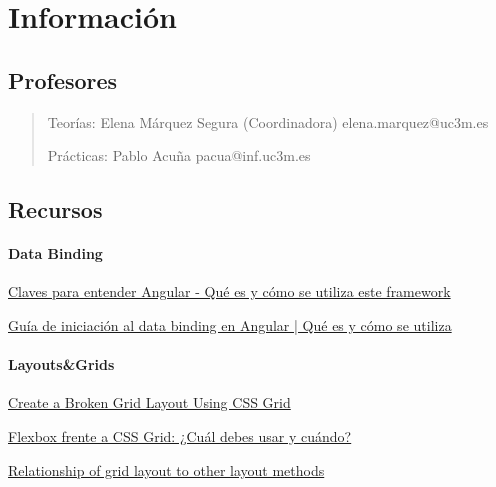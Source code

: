 \documentclass[12pt, twoside, openright]{report} %
\begin{document}
\listoffigures
\thispagestyle{fancy}





\chapter{Información}
\section{Profesores}
\begin{quote}
	Teorías: Elena Márquez Segura (Coordinadora) elena.marquez@uc3m.es

	Prácticas: Pablo Acuña pacua@inf.uc3m.es
\end{quote}

\section{Recursos}

\subsubsection{Data Binding}
\href{https://www.acontracorrientech.com/claves-para-entender-angular-que-es-y-como-se-utiliza/}{Claves para entender Angular - Qué es y cómo se utiliza este framework}

\href{https://www.acontracorrientech.com/guia-practica-del-databinding-en-angular/}{Guía de iniciación al data binding en Angular | Qué es y cómo se utiliza}

\subsubsection{Layouts\&Grids}
\href{https://webdesign.tutsplus.com/tutorials/create-a-broken-grid-layout-using-css-grid--cms-30870}{Create a Broken Grid Layout Using CSS Grid}

\href{https://webdesign.tutsplus.com/es/articles/flexbox-vs-css-grid-which-should-you-use--cms-30184}{Flexbox frente a CSS Grid: ¿Cuál debes usar y cuándo?}

\href{https://developer.mozilla.org/en-US/docs/Web/CSS/CSS_Grid_Layout/Relationship_of_Grid_Layout#grid_and_flexbox}{Relationship of grid layout to other layout methods}
\end{document}
